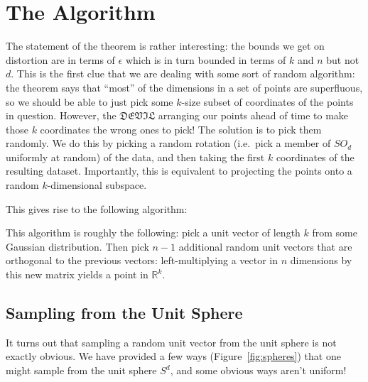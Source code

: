 \documentclass[11pt]{article}
\begin{document}
\section{The Algorithm}

The statement of the theorem is rather interesting: the bounds we get on
distortion are in terms of $\epsilon$ which is in turn bounded in terms of $k$
and $n$ but not $d$. This is the first clue that we are dealing with some sort
of random algorithm: the theorem says that ``most'' of the dimensions in a set
of points are superfluous, so we should be able to just pick some $k$-size
subset of coordinates of the points in question. However, the $\mathfrak{DEVIL}$
arranging our points ahead of time to make those $k$ coordinates the wrong ones
to pick! The solution is to pick them randomly. We do this by picking a random
rotation (i.e.~pick a member of $\textit{SO}_d$ uniformly at random)  of the
data, and then taking the first $k$ coordinates of the resulting dataset.
Importantly, this is equivalent to projecting the points onto a random
$k$-dimensional subspace.

This gives rise to the following algorithm:

This algorithm is roughly the following: pick a unit vector
of length $k$ from some Gaussian distribution. Then pick $n-1$ additional random
unit vectors that are orthogonal to the previous vectors: left-multiplying a vector
in $n$ dimensions by this new matrix yields a point in $\mathbb{R}^k$.



\subsection{Sampling from the Unit Sphere}
It turns out that sampling a random unit vector from the unit sphere is not exactly obvious. We have provided a few ways (Figure~\ref{fig:spheres}) that one might sample from the unit sphere $S^d$, and some obvious ways aren't uniform!
\end{document}
